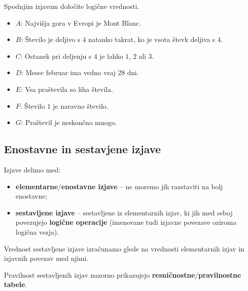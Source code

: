          

         
             \begin{naloga}
                Spodnjim izjavam določite logične vrednosti.
                \begin{itemize}   
                    \item $A$: Najvišja gora v Evropi je Mont Blanc.
                    \item $B$: Število je deljivo s $4$ natanko takrat, ko je vsota števk deljiva s $4$.
                    \item $C$: Ostanek pri deljenju s $4$ je lahko $1$, $2$ ali $3$.
                    \item $D$: Mesec februar ima vedno vsaj 28 dni.
                    \item $E$: Vsa praštevila so liha števila.
                    \item $F$: Število $1$ je naravno število.
                    \item $G$: Praštevil je neskončno mnogo.
                \end{itemize}
            \end{naloga}
            
         

         
              \subsection{Enostavne in sestavjene izjave}
                
                Izjave delimo med:
                \begin{itemize}
                    \item \textbf{elementarne}/\textbf{enostavne izjave} -- ne moremo 
                        jih razstaviti na bolj enostavne;
                    \item \textbf{sestavljene izjave} -- sestavljene iz elementarnih izjav, 
                        ki jih med seboj povezujejo \textbf{logične operacije} (imenovane 
                        tudi izjavne povezave oziroma~ logična vezja).
                \end{itemize}
             

               
                Vrednost sestavljene izjave izračunamo glede na vrednosti elementarnih 
                izjav in izjavnih povezav med njimi.
             
               
                Pravilnost sestavljenih izjav nazorno prikazujejo 
                \textbf{resničnostne}/\textbf{pravilnostne tabele}.
             

